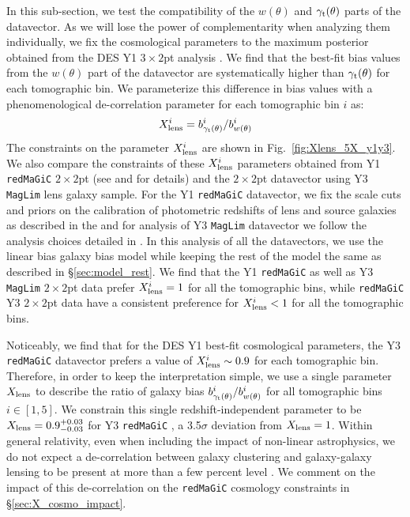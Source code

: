 \documentclass[aps, prd,twocolumn,superscriptaddress,nofootinbib,preprintnumbers]{revtex4-1}
\newcommand{\gammat}{\ensuremath{\gamma_{\rm t}(\theta)}}
\newcommand{\wtheta}{\ensuremath{w(\theta)}}
\newcommand{\redmagic}{\texttt{redMaGiC} }
\newcommand{\maglim}{\texttt{MagLim} }
\begin{document}
In this sub-section, we test the compatibility of the $\wtheta$ and $\gammat$ parts of the datavector. As we will lose the power of complementarity when analyzing them individually, we fix the cosmological parameters to the maximum posterior obtained from the DES Y1 $3\times 2$pt analysis \citep{Abbott_2018}. We find that the best-fit bias values from the $\wtheta$ part of the datavector are systematically higher than $\gammat$ for each tomographic bin. We parameterize this difference in bias values with a phenomenological de-correlation parameter for each tomographic bin $i$ as:
\begin{equation}
    X^{i}_{\rm lens} = b^i_{\gammat}/b^i_{\wtheta}
\end{equation}
The constraints on the parameter $X^{i}_{\rm lens}$ are shown in Fig.~\ref{fig:Xlens_5X_y1y3}. We also compare the constraints of these $X^{i}_{\rm lens}$ parameters obtained from Y1 \redmagic $2 \times 2$pt (see \citet*{Abbott_2018} and \citet*{gglpaper} for details) and the $2 \times 2$pt datavector using Y3 \maglim lens galaxy sample. For the Y1 \redmagic datavector,  we fix the scale cuts and priors on the calibration of photometric redshifts of lens and source galaxies as described in the \citet{Abbott_2018} and for analysis of Y3 \maglim datavector we follow the analysis choices detailed in \citet*{y3-2x2ptaltlensresults}. In this analysis of all the datavectors, we use the linear bias galaxy bias model while keeping the rest of the model the same as described in \S\ref{sec:model_rest}. We find that the Y1 \redmagic as well as Y3 \maglim $2\times 2$pt data prefer $X^{i}_{\rm lens} = 1$ for all the tomographic bins, while \redmagic Y3 $2\times 2$pt data have a consistent preference for $X^{i}_{\rm lens} < 1$ for all the tomographic bins.

Noticeably, we find that for the DES Y1 best-fit cosmological parameters, the Y3 \redmagic datavector prefers a value of $X^{i}_{\rm lens} \sim 0.9$ for each tomographic bin. Therefore, in order to keep the interpretation simple, we use a single parameter $X_{\rm lens}$ to describe the ratio of galaxy bias $b^i_{\gammat}/b^i_{\wtheta}$ for all tomographic bins $ i \in [1,5]$. We constrain this single redshift-independent parameter to be $X_{\rm lens} = 0.9^{+0.03}_{-0.03}$ for Y3 \redmagic, a 3.5$\sigma$ deviation from $X_{\rm lens} = 1$. Within general relativity, even when including the impact of non-linear astrophysics, we do not expect a de-correlation between galaxy clustering and galaxy-galaxy lensing to be present at more than a few percent level \citep{Desjacques_2018}. We comment on the impact of this de-correlation on the \redmagic cosmology constraints in \S\ref{sec:X_cosmo_impact}. 
\end{document}
